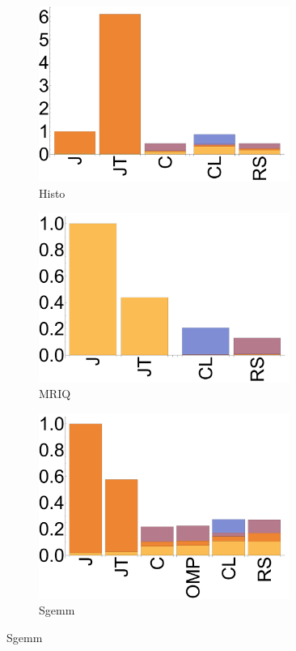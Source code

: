 \begin{figure}[ht]
  \begin{subfigure}[b]{0.3\textwidth}
      \includegraphics[width=0.9\textwidth]{data/bbattery_histogram_nexus7.pdf}
      \caption{Histo}\label{fig:histo}
  \end{subfigure}

  \begin{subfigure}[b]{0.3\textwidth}
      \includegraphics[width=0.9\textwidth]{data/bbattery_mriq_nexus7.pdf}
      \caption{MRIQ} \label{fig:MRIQ}
  \end{subfigure}

  \begin{subfigure}[b]{0.3\textwidth}
      \includegraphics[width=0.9\textwidth]{data/bbattery_sgemm_nexus7.pdf}
      \caption{Sgemm}\label{fig:Sgemm}
  \end{subfigure}


\end{figure}
